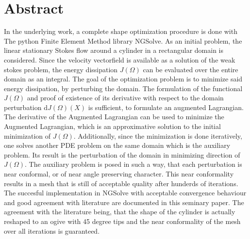 
\section*{Abstract}
In the underlying work, a complete shape optimization procedure is done with The python Finite Element Method 
library NGSolve. As an initial problem, the linear stationary Stokes flow around a cylinder in a rectangular
domain is considered. Since the velocity vectorfield is available as a solution of the weak stokes problem, 
the energy dissipation $J(\Omega)$ can be evaluated over the entire domain as an integral. The goal of the 
optimization problem is to minimize said energy dissipation, by perturbing the domain. The formulation of the
functional $J(\Omega)$ and proof of existence of its derivative with respect to the domain perturbation 
$\mathrm{d}J(\Omega)(X)$ is sufficient, to formulate an augmented Lagrangian. The derivative of the Augmented
Lagrangian can be used to minimize the Augmented Lagrangian, which is an approximative solution to the 
initial minimization of $J(\Omega)$. Additionally, since the minimization is done iteratively, one solves 
another PDE problem on the same domain which is the auxiliary problem. Its result is the perturbation
of the domain in minimizing direction of $J(\Omega)$. The auxiliary problem is posed in such a way, that 
each perturbation is near conformal, or of near angle preserving character. This near conformality results
in a mesh that is still of acceptable quality after hunderds of iterations. The succesful implementation in 
NGSolve with acceptable convergence behaviour and good agreement with literature are documented in this 
seminary paper. The agreement with the literature being, that the shape of the cylinder is actually 
reshaped to an ogive with 45 degree tips and the near conformality of the mesh over all iterations is 
guaranteed.
